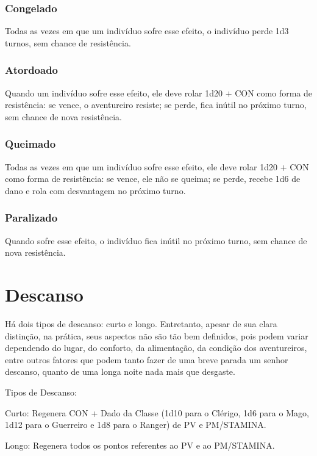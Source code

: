 \documentclass[10pt,twoside,twocolumn]{book}
\begin{document}
\subsubsection*{Congelado}
Todas as vezes em que um indivíduo sofre esse efeito, o indivíduo perde 1d3 turnos, sem chance de resistência.

\subsubsection*{Atordoado}
Quando um indivíduo sofre esse efeito, ele deve rolar 1d20 $+$ CON como forma de resistência: se vence, o aventureiro resiste; se perde, fica inútil no próximo turno, sem chance de nova resistência. 

\subsubsection*{Queimado}
Todas as vezes em que um indivíduo sofre esse efeito, ele deve rolar 1d20 $+$ CON como forma de resistência: se vence, ele não se queima; se perde, recebe 1d6 de dano e rola com desvantagem no próximo turno. 

\subsubsection*{Paralizado}
Quando sofre esse efeito, o indivíduo fica inútil no próximo turno, sem chance de nova resistência.

\section{Descanso}
Há dois tipos de descanso: curto e longo. Entretanto, apesar de sua clara distinção, na prática, seus aspectos não são tão bem definidos, pois podem variar dependendo do lugar, do conforto, da alimentação, da condição dos aventureiros, entre outros fatores que podem tanto fazer de uma breve parada um senhor descanso, quanto de uma longa noite nada mais que desgaste.

\begin{rpg-quotebox}{Tipos de Descanso:}
	\begin{rpg-list}
      	\item Curto: Regenera CON + Dado da Classe (1d10 para o Clérigo, 1d6 para o Mago, 1d12 para o Guerreiro e 1d8 para o Ranger) de PV e PM/STAMINA.
        \item Longo: Regenera todos os pontos referentes ao PV e ao PM/STAMINA.
	\end{rpg-list}
\end{rpg-quotebox}
\end{document}
